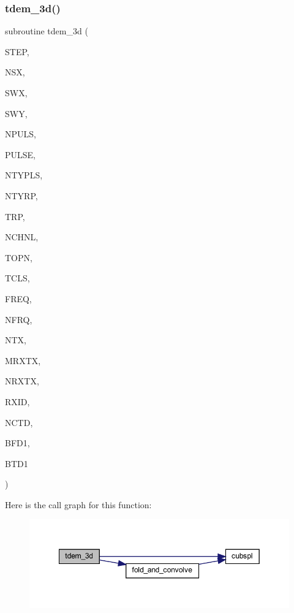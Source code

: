 \subsubsection{\texorpdfstring{tdem\+\_\+3d()}{tdem\_3d()}}
{\footnotesize\ttfamily subroutine tdem\+\_\+3d (\begin{DoxyParamCaption}\item[{integer}]{S\+T\+EP,  }\item[{integer}]{N\+SX,  }\item[{real, dimension(nsx)}]{S\+WX,  }\item[{real, dimension(nsx,3)}]{S\+WY,  }\item[{integer}]{N\+P\+U\+LS,  }\item[{real}]{P\+U\+L\+SE,  }\item[{integer}]{N\+T\+Y\+P\+LS,  }\item[{integer}]{N\+T\+Y\+RP,  }\item[{real, dimension(ntyrp)}]{T\+RP,  }\item[{integer}]{N\+C\+H\+NL,  }\item[{real, dimension(nchnl)}]{T\+O\+PN,  }\item[{real, dimension(nchnl)}]{T\+C\+LS,  }\item[{real, dimension(nfrq)}]{F\+R\+EQ,  }\item[{integer}]{N\+F\+RQ,  }\item[{integer}]{N\+TX,  }\item[{integer}]{M\+R\+X\+TX,  }\item[{integer, dimension(ntx)}]{N\+R\+X\+TX,  }\item[{integer, dimension(mrxtx,ntx)}]{R\+X\+ID,  }\item[{integer, dimension(mrxtx,ntx)}]{N\+C\+TD,  }\item[{complex, dimension(nfrq,mrxtx,ntx,3)}]{B\+F\+D1,  }\item[{real, dimension(nchnl,mrxtx,ntx,3)}]{B\+T\+D1 }\end{DoxyParamCaption})}

Here is the call graph for this function\+:\nopagebreak
\begin{figure}[H]
\begin{center}
\leavevmode
\includegraphics[width=349pt]{Leroi__c_8f90_a9459812f7e65c931ea1310423669f22a_cgraph}
\end{center}
\end{figure}
\mbox{\label{Leroi__c_8f90_a91b093a6d74ab88b54c4e2121d31ffa2}} 
